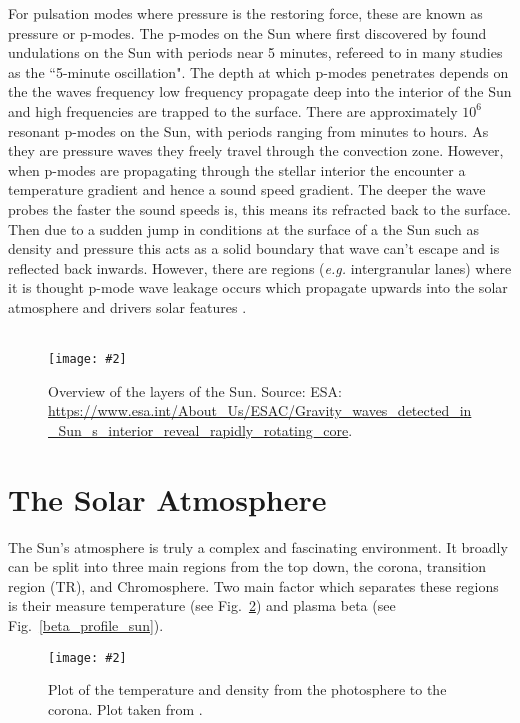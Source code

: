 \documentclass[12pt]{ociamthesis}
\newcommand{\mfig}[4]{
  \begin{figure}
  \begin{center}
  \texttt{[image: \#2]}
  \caption{#3}
  \label{#4}
  \end{center}
  \end{figure}}
\newcommand{\np}{\\ \\}
\begin{document}
For pulsation modes where pressure is the restoring force, these are known as pressure or p-modes. The p-modes on the Sun where first discovered by \cite{Leighton1962ApJ135474L} found undulations on the Sun with periods near 5 minutes, refereed to in many studies as the ``5-minute oscillation". The depth at which p-modes penetrates depends on the the waves frequency low frequency propagate deep into the interior of the Sun and high frequencies are trapped to the surface. There are approximately $10^6$ resonant p-modes on the Sun, with periods ranging from minutes to hours. As they are pressure waves they freely travel through the convection zone. However, when p-modes are propagating through the stellar interior the encounter a temperature gradient and hence a sound speed gradient. The deeper the wave probes the faster the sound speeds is, this means its refracted back to the surface. Then due to a sudden jump in conditions at the surface of a the Sun such as density and pressure this acts as a solid boundary that wave can't escape and is reflected back inwards. However, there are regions (\textit{e.g.} intergranular lanes) where it is thought p-mode wave leakage occurs which propagate upwards into the solar atmosphere and drivers solar features \citep{Suematsu1990LNP367211S, Pontieu2005ApJ624L61D, Heggland2007ApJ6661277H, Pontieu2004Natur}. \np
\mfig{0.8}{figures/image10.png}{Overview of the layers of the Sun. Source: ESA: \url{https://www.esa.int/About_Us/ESAC/Gravity_waves_detected_in_Sun_s_interior_reveal_rapidly_rotating_core}.}{on_model}
\section{The Solar Atmosphere}
\label{sec:sol_atmos}
The Sun's atmosphere is truly a complex and fascinating environment. It broadly can be split into three main regions from the top down, the corona, transition region (TR), and Chromosphere. Two main factor which separates these regions is their measure temperature (see Fig.~\ref{t_profile_sun}) and plasma beta (see Fig.~\ref{beta_profile_sun}). 
\mfig{0.725}{figures/T_regoins}{Plot of the temperature and density from the photosphere to the corona. Plot taken from \cite{Lang_2006ses}.}{t_profile_sun}
\end{document}
